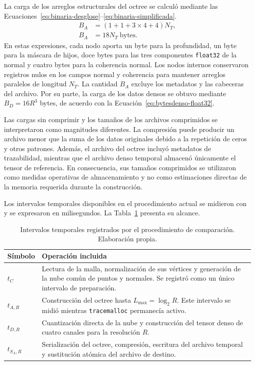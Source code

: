 La carga de los arreglos estructurales del octree se calculó mediante las Ecuaciones~\eqref{eq:binaria-desglose}--\eqref{eq:binaria-simplificada}.
\begin{subequations}\label{eq:binaria}
\begin{align}
B_A&=(1+1+3\times4+4)N_T, \label{eq:binaria-desglose} \\
B_A&=18N_T\ \text{bytes}. \label{eq:binaria-simplificada}
\end{align}
\end{subequations}
En estas expresiones, cada nodo aporta un byte para la profundidad, un byte para la máscara de hijos, doce bytes para las tres componentes \texttt{float32} de la normal y cuatro bytes para la coherencia normal. Los nodos internos conservaron registros nulos en los campos normal y coherencia para mantener arreglos paralelos de longitud $N_T$. La cantidad $B_A$ excluye los metadatos y las cabeceras del archivo. Por su parte, la carga de los datos densos se obtuvo mediante $B_D=16R^3$ bytes, de acuerdo con la Ecuación~\eqref{eq:bytesdenso-float32}.

Las cargas sin comprimir y los tamaños de los archivos comprimidos se interpretaron como magnitudes diferentes. La compresión puede producir un archivo menor que la suma de los datos originales debido a la repetición de ceros y otros patrones. Además, el archivo del octree incluyó metadatos de trazabilidad, mientras que el archivo denso temporal almacenó únicamente el tensor de referencia. En consecuencia, sus tamaños comprimidos se utilizaron como medidas operativas de almacenamiento y no como estimaciones directas de la memoria requerida durante la construcción.

Los intervalos temporales disponibles en el procedimiento actual se midieron con \protect{} y se expresaron en milisegundos. La Tabla~\ref{tab:tiempos} presenta su alcance.

\begin{table}[H]
\centering
\small
\caption{Intervalos temporales registrados por el procedimiento de comparación. Elaboración propia.}
\label{tab:tiempos}
\begin{tabularx}{\textwidth}{@{}p{2.7cm}X@{}}
\toprule
Símbolo & Operación incluida \\
\midrule
$t_C$ &
Lectura de la malla, normalización de sus vértices y generación de la nube común de puntos y normales. Se registró como un único intervalo de preparación. \\

$t_{A,R}$ &
Construcción del octree hasta $L_{\max}=\log_2 R$. Este intervalo se midió mientras \texttt{tracemalloc} permanecía activo. \\

$t_{D,R}$ &
Cuantización directa de la nube y construcción del tensor denso de cuatro canales para la resolución $R$. \\

$t_{S_A,R}$ &
Serialización del octree, compresión, escritura del archivo temporal y sustitución atómica del archivo de destino. \\
\bottomrule
\end{tabularx}
\end{table}

